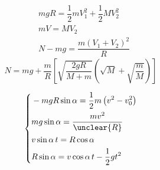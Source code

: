 \begin{problem}
\begin{solution}
\begin{align*}
&mgR=\dfrac12mV_1^2+\dfrac12MV_2^2\\
&mV=MV_2\\
&N-mg=\dfrac{m(V_1+V_2)^2}{R}
\end{align*}
\[ N=mg+\dfrac{m}{R}\left[\sqrt{\dfrac{2gR}{M+m}}\left(\sqrt{M}+\sqrt{\dfrac{m}{M}}\right)\right] \]
\end{solution}
\end{problem}
\[
\left\{\begin{aligned}
&-mgR\sin\alpha=\dfrac12m\left(v^2-v_0^2\right)\\
&mg\sin\alpha=\dfrac{mv^2}{\unclear{R}}\\
&v\sin\alpha\,t=R\cos\alpha\\
&R\sin\alpha=v\cos\alpha\,t-\dfrac12gt^2
\end{aligned}\right.
\]
